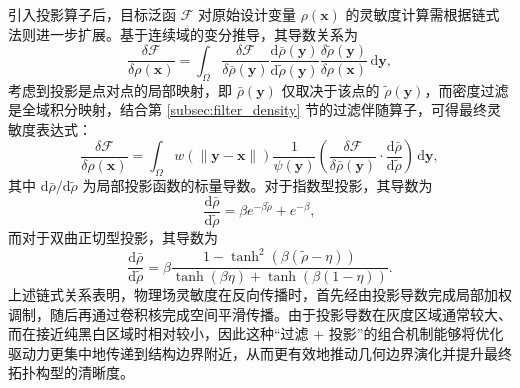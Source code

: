 引入投影算子后，目标泛函 $\mathcal{F}$ 对原始设计变量 $\rho(\boldsymbol{x})$ 的灵敏度计算需根据链式法则进一步扩展。基于连续域的变分推导，其导数关系为
\[
\frac{\delta \mathcal{F}}{\delta \rho(\boldsymbol{x})} = \int_{\Omega} \frac{\delta \mathcal{F}}{\delta \bar{\rho}(\boldsymbol{y})} \frac{\mathrm{d} \bar{\rho}(\boldsymbol{y})}{\mathrm{d} \tilde{\rho}(\boldsymbol{y})} \frac{\delta \tilde{\rho}(\boldsymbol{y})}{\delta \rho(\boldsymbol{x})} \, \mathrm{d}\boldsymbol{y},
\]
考虑到投影是点对点的局部映射，即 $\bar{\rho}(\boldsymbol{y})$ 仅取决于该点的 $\tilde{\rho}(\boldsymbol{y})$，而密度过滤是全域积分映射，结合第 \ref{subsec:filter_density} 节的过滤伴随算子，可得最终灵敏度表达式：
\begin{equation} \label{eq:ch2_final_chain_rule}
	\frac{\delta \mathcal{F}}{\delta \rho(\boldsymbol{x})} = \int_{\Omega} w(\|\boldsymbol{y} - \boldsymbol{x}\|) \frac{1}{\psi(\boldsymbol{y})} \left( \frac{\delta \mathcal{F}}{\delta \bar{\rho}(\boldsymbol{y})} \cdot \frac{\mathrm{d} \bar{\rho}}{\mathrm{d} \tilde{\rho}} \right) \, \mathrm{d}\boldsymbol{y},
\end{equation}
其中 $\mathrm{d} \bar{\rho} / \mathrm{d} \tilde{\rho}$ 为局部投影函数的标量导数。对于指数型投影，其导数为
\[
\frac{\mathrm{d} \bar{\rho}}{\mathrm{d} \tilde{\rho}} = \beta e^{-\beta \tilde{\rho}} + e^{-\beta},
\]
而对于双曲正切型投影，其导数为
\[
\frac{\mathrm{d} \bar{\rho}}{\mathrm{d} \tilde{\rho}} = \beta \frac{1 - \tanh^2(\beta (\tilde{\rho} - \eta))}{\tanh(\beta \eta) + \tanh(\beta (1 - \eta))}.
\]
上述链式关系表明，物理场灵敏度在反向传播时，首先经由投影导数完成局部加权调制，随后再通过卷积核完成空间平滑传播。由于投影导数在灰度区域通常较大、而在接近纯黑白区域时相对较小，因此这种“过滤 + 投影”的组合机制能够将优化驱动力更集中地传递到结构边界附近，从而更有效地推动几何边界演化并提升最终拓扑构型的清晰度。


